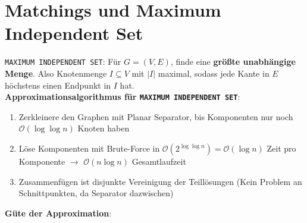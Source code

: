 \section{Matchings und Maximum Independent Set}

\texttt{MAXIMUM INDEPENDENT SET}: Für $G = (V, E)$, finde eine \textbf{größte unabhängige Menge}.
Also Knotenmenge $I\subseteq V$ mit $|I|$ maximal, sodass jede Kante in $E$ höchstens einen Endpunkt in $I$ hat.\\

\textbf{Approximationsalgorithmus für \texttt{MAXIMUM INDEPENDENT SET}}:
\begin{enumerate}
	\item Zerkleinere den Graphen mit Planar Separator, bis Komponenten nur noch $\mathcal{O}(\log\log n)$ Knoten haben
	\item Löse Komponenten mit Brute-Force in $\mathcal{O}(2^{\log\log n})= \mathcal{O}(\log n)$ Zeit pro Komponente $\rightarrow$ $\mathcal{O}(n\log n)$ Gesamtlaufzeit
	\item Zusammenfügen ist disjunkte Vereinigung der Teillösungen (Kein Problem an Schnittpunkten, da Separator dazwischen)
\end{enumerate}
\medskip
\textbf{Güte der Approximation}:

